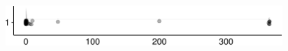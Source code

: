 \documentclass[
]{article}
\begin{document}
\begin{minipage}[t]{0.3\linewidth}

~

\end{minipage}%
\begin{minipage}[t]{0.7\linewidth}

\includegraphics[width=396px]{codebook_template_files/figure-latex/q7_38_rainplot-1}

\end{minipage}
 \vspace*{-5mm} 

\begin{minipage}[t]{0.3\linewidth}

~

\end{minipage}%
\begin{minipage}[t]{0.7\linewidth}

~

\end{minipage}
 \vspace*{-7mm} 
\end{document}

